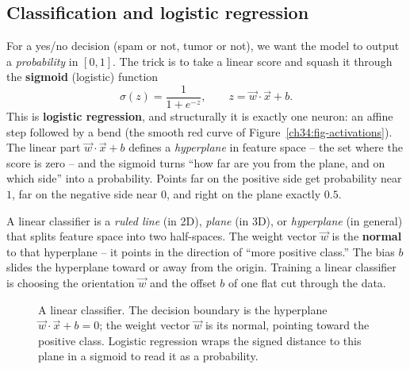 \subsection{Classification and logistic regression}

For a yes/no decision (spam or not, tumor or not), we want the model to output a
\emph{probability} in $[0,1]$. The trick is to take a linear score and squash it through
the \textbf{sigmoid} (logistic) function
\[
\sigma(z)=\frac{1}{1+e^{-z}}, \qquad z = \vec{w}\cdot\vec{x}+b.
\]
This is \textbf{logistic regression}, and structurally it is exactly one neuron: an
affine step followed by a bend (the smooth red curve of Figure~\ref{ch34:fig-activations}). The linear part $\vec{w}\cdot\vec{x}+b$ defines a
\emph{hyperplane} in feature space -- the set where the score is zero -- and the sigmoid
turns ``how far are you from the plane, and on which side'' into a probability. Points far
on the positive side get probability near $1$, far on the negative side near $0$, and
right on the plane exactly $0.5$.

\begin{intuitionbox}
A linear classifier is a \emph{ruled line} (in 2D), \emph{plane} (in 3D), or
\emph{hyperplane} (in general) that splits feature space into two half-spaces. The weight
vector $\vec{w}$ is the \textbf{normal} to that hyperplane -- it points in the direction
of ``more positive class.'' The bias $b$ slides the hyperplane toward or away from the
origin. Training a linear classifier is choosing the orientation $\vec{w}$ and the offset
$b$ of one flat cut through the data.
\end{intuitionbox}

\begin{figure}[H]
\centering
{}
\caption{A linear classifier. The decision boundary is the hyperplane
$\vec{w}\cdot\vec{x}+b=0$; the weight vector $\vec{w}$ is its normal, pointing toward the
positive class. Logistic regression wraps the signed distance to this plane in a sigmoid
to read it as a probability.}
\label{ch34:fig-classifier}
\end{figure}


